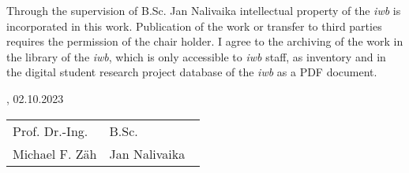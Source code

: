 Through the supervision of B.Sc. Jan Nalivaika intellectual property of the \textit{iwb} is incorporated in this work. Publication of the work or transfer to third parties requires the permission of the chair holder. I agree to the archiving of the work in the library of the \textit{iwb}, which is only accessible to \textit{iwb} staff, as inventory and in the digital student research project database of the \textit{iwb} as a PDF document.
\vfill

\IWBaddressCityChair, 02.10.2023
\vspace{2.5cm}\\
\begin{tabular}{p{0.5\linewidth}p{0.5\linewidth} }
	Prof. Dr.-Ing.		& B.Sc.\\
Michael F. Zäh  	& Jan Nalivaika
\end{tabular}
	
